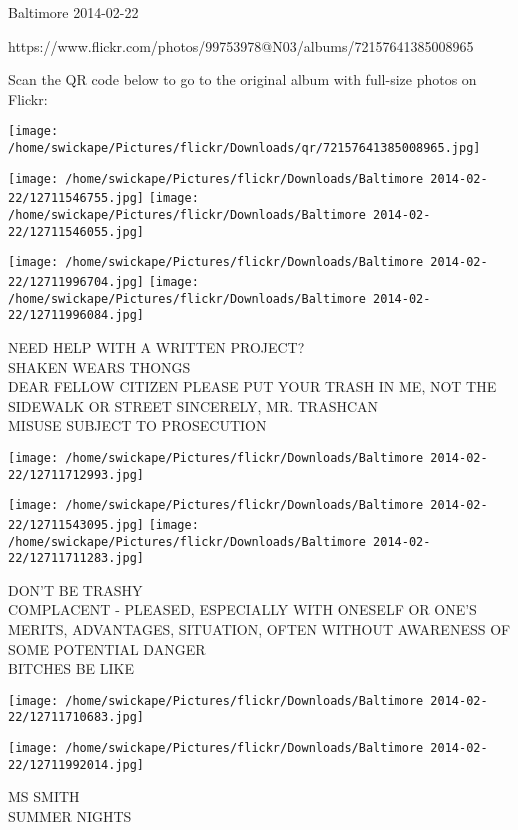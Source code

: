 \documentclass[10pt,letterpaper]{article}
\begin{document}
Baltimore 2014-02-22

https://www.flickr.com/photos/99753978@N03/albums/72157641385008965

Scan the QR code below to go to the original album with full-size photos on Flickr:

\texttt{[image: /home/swickape/Pictures/flickr/Downloads/qr/72157641385008965.jpg]}
\pagebreak

\texttt{[image: /home/swickape/Pictures/flickr/Downloads/Baltimore 2014-02-22/12711546755.jpg]}
\texttt{[image: /home/swickape/Pictures/flickr/Downloads/Baltimore 2014-02-22/12711546055.jpg]}

\texttt{[image: /home/swickape/Pictures/flickr/Downloads/Baltimore 2014-02-22/12711996704.jpg]}
\texttt{[image: /home/swickape/Pictures/flickr/Downloads/Baltimore 2014-02-22/12711996084.jpg]}

NEED HELP WITH A WRITTEN PROJECT?\\
SHAKEN WEARS THONGS\\
DEAR FELLOW CITIZEN PLEASE PUT YOUR TRASH IN ME, NOT THE SIDEWALK OR STREET SINCERELY, MR. TRASHCAN\\
MISUSE SUBJECT TO PROSECUTION\\
\pagebreak

\texttt{[image: /home/swickape/Pictures/flickr/Downloads/Baltimore 2014-02-22/12711712993.jpg]}

\vspace{0.25in}
\texttt{[image: /home/swickape/Pictures/flickr/Downloads/Baltimore 2014-02-22/12711543095.jpg]}
\texttt{[image: /home/swickape/Pictures/flickr/Downloads/Baltimore 2014-02-22/12711711283.jpg]}

DON'T BE TRASHY\\
COMPLACENT {-} PLEASED, ESPECIALLY WITH ONESELF OR ONE'S MERITS, ADVANTAGES, SITUATION, OFTEN WITHOUT AWARENESS OF SOME POTENTIAL DANGER\\
BITCHES BE LIKE\\
\pagebreak

\texttt{[image: /home/swickape/Pictures/flickr/Downloads/Baltimore 2014-02-22/12711710683.jpg]}

\vspace{0.25in}
\texttt{[image: /home/swickape/Pictures/flickr/Downloads/Baltimore 2014-02-22/12711992014.jpg]}

MS SMITH\\
SUMMER NIGHTS\\
\pagebreak
\end{document}
